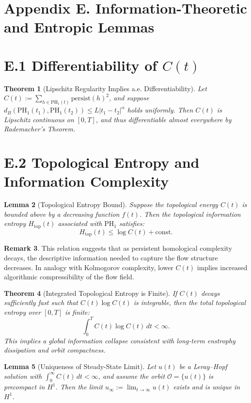 \documentclass[11pt]{article}
\newtheorem{theorem}{Theorem}[section]
\newtheorem{lemma}[theorem]{Lemma}
\theoremstyle{definition}
\newtheorem{remark}[theorem]{Remark}
\begin{document}
\section*{Appendix E. Information-Theoretic and Entropic Lemmas}
\label{sec:appendixE}

\section*{E.1 Differentiability of $C(t)$}
\begin{theorem}[Lipschitz Regularity Implies a.e. Differentiability]
Let $C(t) := \sum_{h \in \mathrm{PH}_1(t)} \mathrm{persist}(h)^2$, and suppose $d_B(\mathrm{PH}_1(t_1), \mathrm{PH}_1(t_2)) \leq L |t_1 - t_2|^\alpha$ holds uniformly. Then $C(t)$ is Lipschitz continuous on $[0,T]$, and thus differentiable almost everywhere by Rademacher’s Theorem.
\end{theorem}

\section*{E.2 Topological Entropy and Information Complexity}
\begin{lemma}[Topological Entropy Bound]
Suppose the topological energy $C(t)$ is bounded above by a decreasing function $f(t)$. Then the topological information entropy $H_\text{top}(t)$ associated with $\mathrm{PH}_1$ satisfies:
\[
H_\text{top}(t) \leq \log C(t) + \text{const}.
\]
\end{lemma}

\begin{remark}
This relation suggests that as persistent homological complexity decays, the descriptive information needed to capture the flow structure decreases. In analogy with Kolmogorov complexity, lower $C(t)$ implies increased algorithmic compressibility of the flow field.
\end{remark}

\begin{theorem}[Integrated Topological Entropy is Finite]
If $C(t)$ decays sufficiently fast such that $C(t) \log C(t)$ is integrable, then the total topological entropy over $[0,T]$ is finite:
\[
\int_0^T C(t) \log C(t)\, dt < \infty.
\]
This implies a global information collapse consistent with long-term enstrophy dissipation and orbit compactness.
\end{theorem}

\begin{lemma}[Uniqueness of Steady-State Limit]
Let $u(t)$ be a Leray--Hopf solution with $\int_0^\infty C(t)\,dt < \infty$, and assume the orbit $\mathcal{O} = \{u(t)\}$ is precompact in $H^1$. Then the limit $u_\infty := \lim_{t \to \infty} u(t)$ exists and is unique in $H^1$.
\end{lemma}
\end{document}
